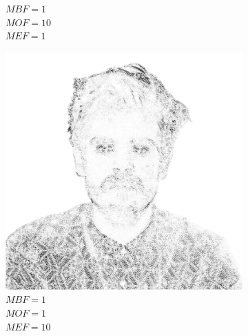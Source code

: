 \documentclass[a4paper, 12pt, polish, twoside]{extreport}
\begin{document}
\begin{figure}[H]
\begin{subfigure}{0.32\textwidth}
        \caption{\(MBF = 1\) \\ \(MOF = 10\) \\ \(MEF = 1\)}
        \label{mine-param-taco-e}
    \end{subfigure}
    \begin{subfigure}{0.32\textwidth}
        \centering
        \includegraphics[width = \textwidth]{img/4-mine/taco-mask/taco_mask_c20_inv0_bg1_obj1_ed10.png}
        \caption{\(MBF = 1\) \\ \(MOF = 1\) \\ \(MEF = 10\)}
        \label{mine-param-taco-f}
    \end{subfigure}\\
    \begin{subfigure}{0.32\textwidth}
        \centering

\end{subfigure}
\end{figure}
\end{document}
